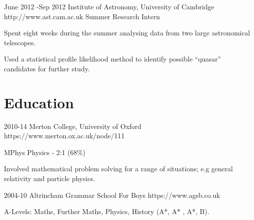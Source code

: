 \documentclass[10pt]{article} %
\begin{document}
\job
{June 2012 -}{Sep 2012}
{Institute of Astronomy, University of Cambridge}
{http://www.ast.cam.ac.uk}
{Summer Research Intern}
{\begin{itemize-noindent}
  \item{Spent eight weeks during the summer analysing data from two large astronomical telescopes.}
  \item{Used a statistical profile likelihood method to identify possible ``quasar'' candidates for further study.}
 \end{itemize-noindent}}

\section{Education}
\edu
{2010-14}
{Merton College, University of Oxford}
{https://www.merton.ox.ac.uk/node/111}
{
  \begin{itemize-noindent}
  \item{MPhys Physics - 2:1 (68\%)}
  \item{Involved mathematical problem solving for a range of situations; e.g general relativity and particle physics.}
  \end{itemize-noindent}
}

\edu
{2004-10}
{Altrincham Grammar School For Boys}
{https://www.agsb.co.uk}
{
  \begin{itemize-noindent}
  \item{A-Levels: Maths, Further Maths, Physics, History (A*, A* , A*, B).}
  \end{itemize-noindent}
}




\end{document}
